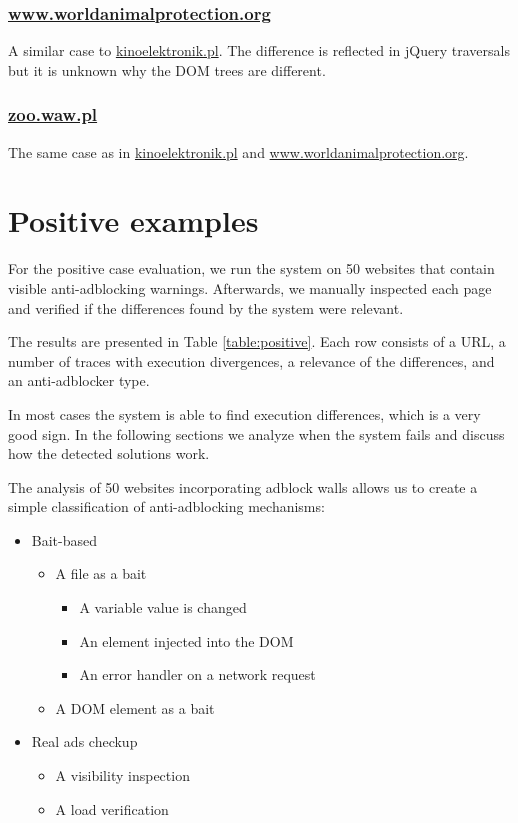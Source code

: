 \subsubsection{\url{www.worldanimalprotection.org}}
A similar case to \url{kinoelektronik.pl}. The difference is reflected in jQuery traversals
but it is unknown why the DOM trees are different.

\subsubsection{\url{zoo.waw.pl}}
The same case as in \url{kinoelektronik.pl} and \url{www.worldanimalprotection.org}.


\section{Positive examples}

For the positive case evaluation, we run the system on 50 websites that contain visible anti-adblocking warnings.
Afterwards, we manually inspected each page and verified if the differences found by the system were relevant.

The results are presented in Table \ref{table:positive}.
Each row consists of a URL, a number of traces with execution divergences, a relevance of the differences,
and an anti-adblocker type.

In most cases the system is able to find execution differences, which is a very good sign.
In the following sections we analyze when the system fails and discuss
how the detected solutions work.

The analysis of 50 websites incorporating adblock walls allows us to create a simple
classification of anti-adblocking mechanisms:
\begin{itemize}
  \item Bait-based
    \begin{itemize}
     \item A file as a bait
       \begin{itemize}
         \item A variable value is changed
         \item An element injected into the DOM
         \item An error handler on a network request
       \end{itemize}
     \item A DOM element as a bait
    \end{itemize}
  \item Real ads checkup
    \begin{itemize}
      \item A visibility inspection
      \item A load verification
    \end{itemize}
\end{itemize}

